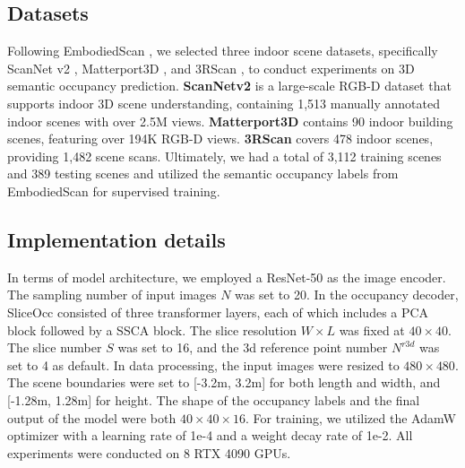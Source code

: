 \documentclass[letterpaper, 10 pt, conference]{ieeeconf}  %
\begin{document}
\subsection{Datasets}
Following EmbodiedScan \cite{wang2024embodiedscan}, we selected three indoor scene datasets, specifically ScanNet v2 \cite{dai2017scannet}, Matterport3D \cite{chang2017matterport3d}, and 3RScan \cite{wald2019rio}, to conduct experiments on 3D semantic occupancy prediction. \textbf{ScanNetv2} is a large-scale RGB-D dataset that supports indoor 3D scene understanding, containing 1,513 manually annotated indoor scenes with over 2.5M views. \textbf{Matterport3D} contains 90 indoor building scenes, featuring over 194K RGB-D views. \textbf{3RScan} covers 478 indoor scenes, providing 1,482 scene scans.
Ultimately, we had a total of 3,112 training scenes and 389 testing scenes and utilized the semantic occupancy labels from EmbodiedScan for supervised training.
\subsection{Implementation details}

In terms of model architecture, we employed a ResNet-50 as the image encoder. The sampling number of input images $N$ was set to 20. In the occupancy decoder, SliceOcc consisted of three transformer layers, each of which includes a PCA block followed by a SSCA block. The slice resolution $W\times L$ was fixed at $40\times 40$. The slice number $S$ was set to 16, and the 3d reference point number $N^{r3d}$ was set to 4 as default. In data processing, the input images were resized to $480\times480$. The scene boundaries were set to [-3.2m, 3.2m] for both length and width, and [-1.28m, 1.28m] for height. The shape of the occupancy labels and the final output of the model were both $40\times40\times16$. For training, we utilized the AdamW optimizer with a learning rate of 1e-4 and a weight decay rate of 1e-2.  All experiments were conducted on 8 RTX 4090 GPUs.
\end{document}

